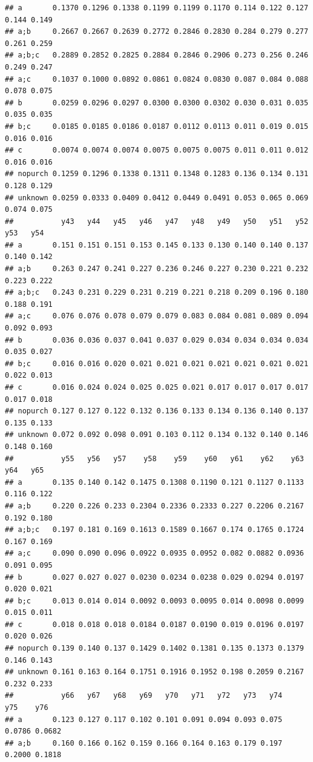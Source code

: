 \documentclass[
]{book}
\begin{document}
\begin{verbatim}
## a       0.1370 0.1296 0.1338 0.1199 0.1199 0.1170 0.114 0.122 0.127 0.144 0.149
## a;b     0.2667 0.2667 0.2639 0.2772 0.2846 0.2830 0.284 0.279 0.277 0.261 0.259
## a;b;c   0.2889 0.2852 0.2825 0.2884 0.2846 0.2906 0.273 0.256 0.246 0.249 0.247
## a;c     0.1037 0.1000 0.0892 0.0861 0.0824 0.0830 0.087 0.084 0.088 0.078 0.075
## b       0.0259 0.0296 0.0297 0.0300 0.0300 0.0302 0.030 0.031 0.035 0.035 0.035
## b;c     0.0185 0.0185 0.0186 0.0187 0.0112 0.0113 0.011 0.019 0.015 0.016 0.016
## c       0.0074 0.0074 0.0074 0.0075 0.0075 0.0075 0.011 0.011 0.012 0.016 0.016
## nopurch 0.1259 0.1296 0.1338 0.1311 0.1348 0.1283 0.136 0.134 0.131 0.128 0.129
## unknown 0.0259 0.0333 0.0409 0.0412 0.0449 0.0491 0.053 0.065 0.069 0.074 0.075
##           y43   y44   y45   y46   y47   y48   y49   y50   y51   y52   y53   y54
## a       0.151 0.151 0.151 0.153 0.145 0.133 0.130 0.140 0.140 0.137 0.140 0.142
## a;b     0.263 0.247 0.241 0.227 0.236 0.246 0.227 0.230 0.221 0.232 0.223 0.222
## a;b;c   0.243 0.231 0.229 0.231 0.219 0.221 0.218 0.209 0.196 0.180 0.188 0.191
## a;c     0.076 0.076 0.078 0.079 0.079 0.083 0.084 0.081 0.089 0.094 0.092 0.093
## b       0.036 0.036 0.037 0.041 0.037 0.029 0.034 0.034 0.034 0.034 0.035 0.027
## b;c     0.016 0.016 0.020 0.021 0.021 0.021 0.021 0.021 0.021 0.021 0.022 0.013
## c       0.016 0.024 0.024 0.025 0.025 0.021 0.017 0.017 0.017 0.017 0.017 0.018
## nopurch 0.127 0.127 0.122 0.132 0.136 0.133 0.134 0.136 0.140 0.137 0.135 0.133
## unknown 0.072 0.092 0.098 0.091 0.103 0.112 0.134 0.132 0.140 0.146 0.148 0.160
##           y55   y56   y57    y58    y59    y60   y61    y62    y63   y64   y65
## a       0.135 0.140 0.142 0.1475 0.1308 0.1190 0.121 0.1127 0.1133 0.116 0.122
## a;b     0.220 0.226 0.233 0.2304 0.2336 0.2333 0.227 0.2206 0.2167 0.192 0.180
## a;b;c   0.197 0.181 0.169 0.1613 0.1589 0.1667 0.174 0.1765 0.1724 0.167 0.169
## a;c     0.090 0.090 0.096 0.0922 0.0935 0.0952 0.082 0.0882 0.0936 0.091 0.095
## b       0.027 0.027 0.027 0.0230 0.0234 0.0238 0.029 0.0294 0.0197 0.020 0.021
## b;c     0.013 0.014 0.014 0.0092 0.0093 0.0095 0.014 0.0098 0.0099 0.015 0.011
## c       0.018 0.018 0.018 0.0184 0.0187 0.0190 0.019 0.0196 0.0197 0.020 0.026
## nopurch 0.139 0.140 0.137 0.1429 0.1402 0.1381 0.135 0.1373 0.1379 0.146 0.143
## unknown 0.161 0.163 0.164 0.1751 0.1916 0.1952 0.198 0.2059 0.2167 0.232 0.233
##           y66   y67   y68   y69   y70   y71   y72   y73   y74    y75    y76
## a       0.123 0.127 0.117 0.102 0.101 0.091 0.094 0.093 0.075 0.0786 0.0682
## a;b     0.160 0.166 0.162 0.159 0.166 0.164 0.163 0.179 0.197 0.2000 0.1818

\end{verbatim}
\end{document}
